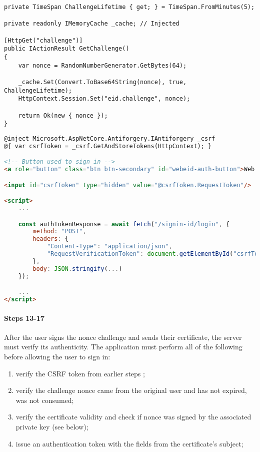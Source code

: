 \begin{lstlisting}[caption={Web eID Challenge Endpoint}, label={lst:web-eid-challenge}]
private TimeSpan ChallengeLifetime { get; } = TimeSpan.FromMinutes(5);

private readonly IMemoryCache _cache; // Injected

[HttpGet("challenge")]
public IActionResult GetChallenge()
{
    var nonce = RandomNumberGenerator.GetBytes(64);

    _cache.Set(Convert.ToBase64String(nonce), true, ChallengeLifetime);
    HttpContext.Session.Set("eid.challenge", nonce);

    return Ok(new { nonce });
}
\end{lstlisting}


\begin{lstlisting}[caption={Web eID UI excerpt}, label={lst:web-eid-challenge-ui}, language={html}]
@inject Microsoft.AspNetCore.Antiforgery.IAntiforgery _csrf
@{ var csrfToken = _csrf.GetAndStoreTokens(HttpContext); }

<!-- Button used to sign in -->
<a role="button" class="btn btn-secondary" id="webeid-auth-button">Web eID</a>

<input id="csrfToken" type="hidden" value="@csrfToken.RequestToken"/>

<script>
    ...

    const authTokenResponse = await fetch("/signin-id/login", {
        method: "POST",
        headers: {
            "Content-Type": "application/json",
            "RequestVerificationToken": document.getElementById("csrfToken").value
        },
        body: JSON.stringify(...)
    });

    ...
</script>
\end{lstlisting}

\paragraph{Steps 13-17}

After the user signs the nonce challenge and sends their certificate, the server must verify its authenticity. The application must perform all of the following before allowing the user to sign in:

\begin{enumerate}
  \item verify the CSRF token from earlier steps \cite{ria-webeid-source-web-eid-authtoken-validation-java-readme};
  \item verify the challenge nonce came from the original user and has not expired, was not consumed;
  \item verify the certificate validity and check if nonce was signed by the associated private key (see below);
  \item issue an authentication token with the fields from the certificate's subject;
\end{enumerate}

